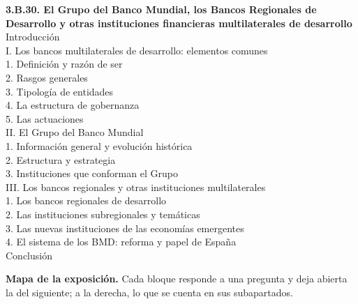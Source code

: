 \documentclass[11pt]{article}
\begin{document}
\begin{esquema}[unbreakable]
\textbf{3.B.30. El Grupo del Banco Mundial, los Bancos Regionales de Desarrollo y otras instituciones financieras multilaterales de desarrollo}\\[2pt]
Introducción\\
I. Los bancos multilaterales de desarrollo: elementos comunes\\
\hspace*{1.5em}1. Definición y razón de ser\\
\hspace*{1.5em}2. Rasgos generales\\
\hspace*{1.5em}3. Tipología de entidades\\
\hspace*{1.5em}4. La estructura de gobernanza\\
\hspace*{1.5em}5. Las actuaciones\\
II. El Grupo del Banco Mundial\\
\hspace*{1.5em}1. Información general y evolución histórica\\
\hspace*{1.5em}2. Estructura y estrategia\\
\hspace*{1.5em}3. Instituciones que conforman el Grupo\\
III. Los bancos regionales y otras instituciones multilaterales\\
\hspace*{1.5em}1. Los bancos regionales de desarrollo\\
\hspace*{1.5em}2. Las instituciones subregionales y temáticas\\
\hspace*{1.5em}3. Las nuevas instituciones de las economías emergentes\\
\hspace*{1.5em}4. El sistema de los BMD: reforma y papel de España\\
Conclusión
\end{esquema}

\begin{anotaciones}
\textbf{Mapa de la exposición.} Cada bloque responde a una pregunta y deja abierta la del siguiente; a la derecha, lo que se cuenta en sus subapartados.
\begin{infografiacaja}
\caption{Mapa del tema: la pregunta de cada bloque, sus subapartados y el hilo que los une}\label{figu:mapa-tema}
\end{infografiacaja}
\end{anotaciones}
\end{document}
